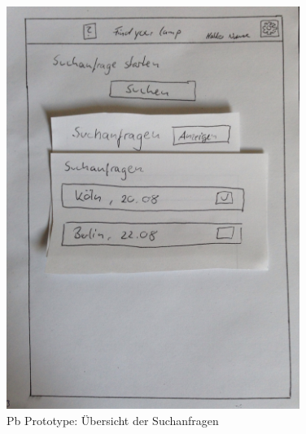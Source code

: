 \begin{figure}[H]
\centering
\includegraphics[angle=90, width=0.85\textwidth]{./images/paperbased/anfrage.JPG}
\caption{Pb Prototype: Übersicht der Suchanfragen}
\label{pbprototype1}
\end{figure}

